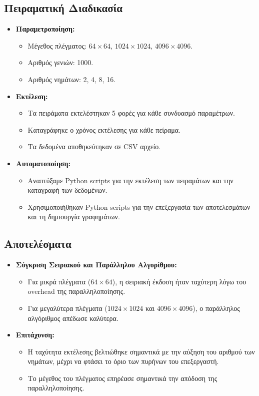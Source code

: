 \documentclass{article}
\begin{document}
\subsection*{Πειραματική Διαδικασία}
\begin{itemize}
    \item \textbf{Παραμετροποίηση:}
    \begin{itemize}
        \item Μέγεθος πλέγματος: $64 \times 64$, $1024 \times 1024$, $4096 \times 4096$.
        \item Αριθμός γενιών: 1000.
        \item Αριθμός νημάτων: 2, 4, 8, 16.
    \end{itemize}
    \item \textbf{Εκτέλεση:}
    \begin{itemize}
        \item Τα πειράματα εκτελέστηκαν 5 φορές για κάθε συνδυασμό παραμέτρων.
        \item Καταγράφηκε ο χρόνος εκτέλεσης για κάθε πείραμα.
        \item Τα δεδομένα αποθηκεύτηκαν σε CSV αρχείο.
    \end{itemize}
    \item \textbf{Αυτοματοποίηση:}
    \begin{itemize}
        \item Αναπτύξαμε Python scripts για την εκτέλεση των πειραμάτων και την καταγραφή των δεδομένων.
        \item Χρησιμοποιήθηκαν Python scripts για την επεξεργασία των αποτελεσμάτων και τη δημιουργία γραφημάτων.
    \end{itemize}
\end{itemize}
\subsection*{Αποτελέσματα}
\begin{itemize}
    \item \textbf{Σύγκριση Σειριακού και Παράλληλου Αλγορίθμου:}
    \begin{itemize}
        \item Για μικρά πλέγματα ($64 \times 64$), η σειριακή έκδοση ήταν ταχύτερη λόγω του overhead της παραλληλοποίησης.
        \item Για μεγαλύτερα πλέγματα ($1024 \times 1024$ και $4096 \times 4096$), ο παράλληλος αλγόριθμος απέδωσε καλύτερα.
    \end{itemize}
    \item \textbf{Επιτάχυνση:}
    \begin{itemize}
        \item Η ταχύτητα εκτέλεσης βελτιώθηκε σημαντικά με την αύξηση του αριθμού των νημάτων, μέχρι να φτάσει το όριο των πυρήνων του επεξεργαστή.
        \item Το μέγεθος του πλέγματος επηρέασε σημαντικά την απόδοση της παραλληλοποίησης.
    \end{itemize}
\end{itemize}
\end{document}
